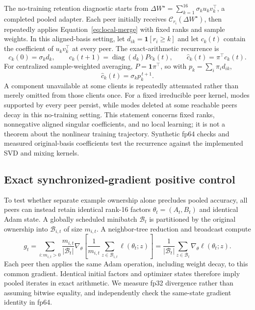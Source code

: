 \documentclass[11pt]{article}
\newcommand{\dW}{\Delta W}
\begin{document}
The no-training retention diagnostic starts from $\dW^\star=\sum_{k=1}^{16}\sigma_ku_kv_k^\top$, a completed pooled adapter. Each peer initially receives $\mathcal C_{r_i}(\dW^\star)$, then repeatedly applies Equation~\eqref{eq:local-merge} with fixed ranks and sample weights. In this aligned-basis setting, let $d_{ik}=\mathbf1[r_i\ge k]$ and let $c_k(t)$ contain the coefficient of $u_kv_k^\top$ at every peer. The exact-arithmetic recurrence is
\begin{equation}
 c_k(0)=\sigma_kd_k,\qquad
 c_k(t+1)=\operatorname{diag}(d_k)P c_k(t),\qquad
 \widehat c_k(t)=\pi^\top c_k(t).
 \label{eq:retention-recurrence}
\end{equation}
For centralized sample-weighted averaging, $P=\mathbf1\pi^\top$, so with $p_k=\sum_i\pi_id_{ik}$,
\begin{equation}
 \widehat c_k(t)=\sigma_kp_k^{\,t+1}.
 \label{eq:central-attrition}
\end{equation}
A component unavailable at some clients is repeatedly attenuated rather than merely omitted from those clients once. For a fixed irreducible peer kernel, modes supported by every peer persist, while modes deleted at some reachable peers decay in this no-training setting. This statement concerns fixed ranks, nonnegative aligned singular coefficients, and no local learning; it is not a theorem about the nonlinear training trajectory. Synthetic fp64 checks and measured original-basis coefficients test the recurrence against the implemented SVD and mixing kernels.

\subsection{Exact synchronized-gradient positive control}
To test whether separate example ownership alone precludes pooled accuracy, all peers can instead retain identical rank-16 factors $\theta_t=(A_t,B_t)$ and identical Adam state. A globally scheduled minibatch $\mathcal B_t$ is partitioned by the original ownership into $\mathcal B_{i,t}$ of size $m_{i,t}$. A neighbor-tree reduction and broadcast compute
\begin{equation}
 g_t=\sum_{i:m_{i,t}>0}\frac{m_{i,t}}{|\mathcal B_t|}
 \nabla_\theta\left[\frac1{m_{i,t}}\sum_{z\in\mathcal B_{i,t}}
 \ell(\theta_t;z)\right]
 =\frac1{|\mathcal B_t|}\sum_{z\in\mathcal B_t}\nabla_\theta\ell(\theta_t;z).
 \label{eq:gradient-equivalence}
\end{equation}
Each peer then applies the same Adam operation, including weight decay, to this common gradient. Identical initial factors and optimizer states therefore imply pooled iterates in exact arithmetic. We measure fp32 divergence rather than assuming bitwise equality, and independently check the same-state gradient identity in fp64.
\end{document}
